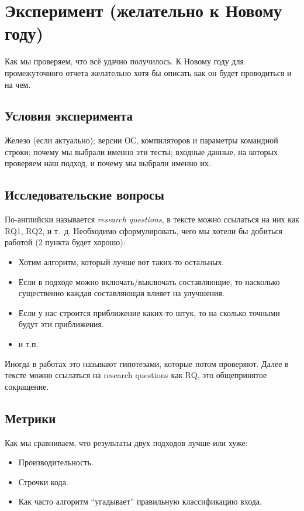
\section{Эксперимент (желательно к Новому году)}
Как мы проверяем, что  всё удачно получилось.  К Новому году для промежуточного отчета желательно хотя бы описать как он будет прово\-диться и на чем.

\subsection{Условия эксперимента}
Железо (если актуально);  версии ОС, компиляторов и параметры командной строки; почему мы выбрали именно эти тесты; входные дан\-ные, на которых проверяем наш подход, и почему мы выбрали именно их.

\subsection{Исследовательские вопросы }
По-английски называется \emph{research questions}, в тексте можно ссылаться на них как RQ1, RQ2, и т.~д.
Необходимо сформулировать, чего мы хотели бы добиться работой (2 пункта будет хорошо):

\begin{itemize}
	\item Хотим алгоритм, который лучше вот таких-то остальных.
	\item Если в подходе можно включать/выключать составляющие, то насколько существенно каждая составляющая влияет на улучшения.
	\item Если у нас строится приближение каких-то штук, то на сколько точными будут эти приближения.
	\item и т.п.
\end{itemize}

Иногда в работах это называют гипотезами, которые потом проверяют. Далее в тексте можно ссылаться на research questions как \textsc{RQ}, это обще\-при\-нятое сокращение.

\subsection{Метрики}

Как мы сравниваем, что результаты двух подходов лучше или хуже:
\begin{itemize}
	\item Производительность.
	\item Строчки кода.
	\item Как часто алгоритм \enquote{угадывает} правильную классификацию входа.
\end{itemize}

